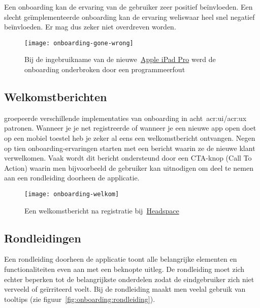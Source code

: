 Een onboarding kan de ervaring van de gebruiker zeer positief beïnvloeden. Een slecht geïmplementeerde onboarding kan de ervaring weliswaar heel snel negatief beïnvloeden. Er mag dus zeker niet overdreven worden.

\begin{figure}
    \centering
    \texttt{[image: onboarding-gone-wrong]}
    \caption[Implementatiefout bij onboarding]{Bij de ingebruikname van de nieuwe~\href{https://www.apple.com/ipad-pro/}{Apple iPad Pro} werd de onboarding onderbroken door een programmeerfout}
    \label{fig:onboarding:fout}
\end{figure}

\subsection{Welkomstberichten}
\label{sec:onboarding:welkomstberichten}

\textcite{Balboni2018} groepeerde verschillende implementaties van onboarding in acht~\acrshort{acr:ui}/\acrshort{acr:ux} patronen. Wanneer je je net registreerde of wanneer je een nieuwe app open doet op een mobiel toestel heb je zeker al eens een welkomstbericht ontvangen. Negen op tien onboarding-ervaringen starten met een bericht waarin ze de nieuwe klant verwelkomen. Vaak wordt dit bericht ondersteund door een CTA-knop (Call To Action) waarin men bijvoorbeeld de gebruiker kan uitnodigen om deel te nemen aan een rondleiding doorheen de applicatie.

\begin{figure}[h!]
    \centering
    \texttt{[image: onboarding-welkom]}
    \caption[Voorbeeld welkomstbericht]{Een welkomstbericht na registratie bij~\href{https://www.headspace.com/}{Headspace}}
    \label{fig:onboarding:welkom}
\end{figure}

\subsection{Rondleidingen}
\label{sec:onboarding:rondleidingen}

Een rondleiding doorheen de applicatie toont alle belangrijke elementen en functionaliteiten even aan met een beknopte uitleg. De rondleiding moet zich echter beperken tot de belangrijkste onderdelen zodat de eindgebruiker zich niet verveeld of geïrriteerd voelt. Bij de rondleiding maakt men veelal gebruik van tooltips (zie figuur~\ref{fig:onboarding:rondleiding}).

